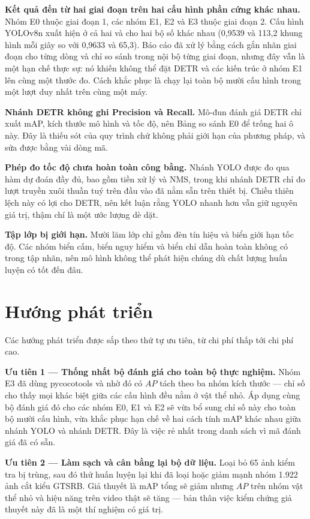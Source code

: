 \textbf{Kết quả đến từ hai giai đoạn trên hai cấu hình phần cứng khác nhau.} Nhóm E0 thuộc giai
đoạn 1, các nhóm E1, E2 và E3 thuộc giai đoạn 2. Cấu hình YOLOv8n xuất hiện ở cả hai và cho hai bộ số
khác nhau (0,9539 và 113,2 khung hình mỗi giây so với 0,9633 và 65,3). Báo cáo đã xử lý bằng cách
gắn nhãn giai đoạn cho từng dòng và chỉ so sánh trong nội bộ từng giai đoạn, nhưng đây vẫn là một hạn chế
thực sự: nó khiến không thể đặt DETR và các kiến trúc ở nhóm E1 lên cùng một thước đo. Cách khắc
phục là chạy lại toàn bộ mười cấu hình trong một lượt duy nhất trên cùng một máy.

\textbf{Nhánh DETR không ghi Precision và Recall.} Mô-đun đánh giá DETR chỉ xuất mAP, kích thước mô
hình và tốc độ, nên Bảng so sánh E0 để trống hai ô này. Đây là thiếu sót của quy trình chứ không
phải giới hạn của phương pháp, và sửa được bằng vài dòng mã.

\textbf{Phép đo tốc độ chưa hoàn toàn công bằng.} Nhánh YOLO được đo qua hàm dự đoán đầy đủ, bao
gồm tiền xử lý và NMS, trong khi nhánh DETR chỉ đo lượt truyền xuôi thuần tuý trên đầu vào đã nằm
sẵn trên thiết bị. Chiều thiên lệch này có lợi cho DETR, nên kết luận rằng YOLO nhanh hơn vẫn giữ
nguyên giá trị, thậm chí là một ước lượng dè dặt.

\textbf{Tập lớp bị giới hạn.} Mười lăm lớp chỉ gồm đèn tín hiệu và biển giới hạn tốc độ. Các nhóm
biển cấm, biển nguy hiểm và biển chỉ dẫn hoàn toàn không có trong tập nhãn, nên mô hình không thể
phát hiện chúng dù chất lượng huấn luyện có tốt đến đâu.

\section{Hướng phát triển}

Các hướng phát triển được sắp theo thứ tự ưu tiên, từ chi phí thấp tới chi phí cao.

\textbf{Ưu tiên 1 --- Thống nhất bộ đánh giá cho toàn bộ thực nghiệm.} Nhóm E3 đã dùng pycocotools
và nhờ đó có $AP$ tách theo ba nhóm kích thước --- chỉ số cho thấy mọi khác biệt giữa các cấu hình
đều nằm ở vật thể nhỏ. Áp dụng cùng bộ đánh giá đó cho các nhóm E0, E1 và E2 sẽ vừa bổ sung chỉ số
này cho toàn bộ mười cấu hình, vừa khắc phục hạn chế về hai cách tính mAP khác nhau giữa nhánh YOLO
và nhánh DETR. Đây là việc rẻ nhất trong danh sách vì mã đánh giá đã có sẵn.

\textbf{Ưu tiên 2 --- Làm sạch và cân bằng lại bộ dữ liệu.} Loại bỏ 65 ảnh kiểm tra bị trùng, sau
đó thử huấn luyện lại khi đã loại hoặc giảm mạnh nhóm 1.922 ảnh cắt kiểu GTSRB. Giả thuyết là
mAP tổng sẽ giảm nhưng $AP$ trên nhóm vật thể nhỏ và hiệu năng trên video thật sẽ tăng --- bản thân
việc kiểm chứng giả thuyết này đã là một thí nghiệm có giá trị.

